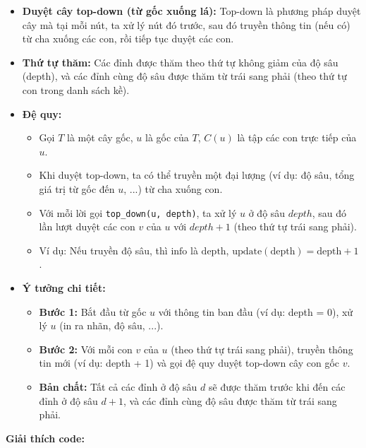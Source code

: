 \documentclass{article}
\begin{document}
\begin{itemize}
    \item \textbf{Duyệt cây top-down (từ gốc xuống lá):} Top-down là phương pháp duyệt cây mà tại mỗi nút, ta xử lý nút đó trước, sau đó truyền thông tin (nếu có) từ cha xuống các con, rồi tiếp tục duyệt các con. 
    \item \textbf{Thứ tự thăm:} Các đỉnh được thăm theo thứ tự không giảm của độ sâu (depth), và các đỉnh cùng độ sâu được thăm từ trái sang phải (theo thứ tự con trong danh sách kề).
    \item \textbf{Đệ quy:}
    \begin{itemize}
        \item Gọi $T$ là một cây gốc, $u$ là gốc của $T$, $C(u)$ là tập các con trực tiếp của $u$.
        \item Khi duyệt top-down, ta có thể truyền một đại lượng (ví dụ: độ sâu, tổng giá trị từ gốc đến $u$, ...) từ cha xuống con.
        \item Với mỗi lời gọi \texttt{top\_down(u, depth)}, ta xử lý $u$ ở độ sâu $depth$, sau đó lần lượt duyệt các con $v$ của $u$ với $depth+1$ (theo thứ tự trái sang phải).
        \item Ví dụ: Nếu truyền độ sâu, thì $\text{info}$ là $\text{depth}$, $\text{update}(\text{depth}) = \text{depth} + 1$.
    \end{itemize}
    \item \textbf{Ý tưởng chi tiết:}
    \begin{itemize}
        \item \textbf{Bước 1:} Bắt đầu từ gốc $u$ với thông tin ban đầu (ví dụ: depth = 0), xử lý $u$ (in ra nhãn, độ sâu, ...).
        \item \textbf{Bước 2:} Với mỗi con $v$ của $u$ (theo thứ tự trái sang phải), truyền thông tin mới (ví dụ: depth + 1) và gọi đệ quy duyệt top-down cây con gốc $v$.
        \item \textbf{Bản chất:} Tất cả các đỉnh ở độ sâu $d$ sẽ được thăm trước khi đến các đỉnh ở độ sâu $d+1$, và các đỉnh cùng độ sâu được thăm từ trái sang phải.
    \end{itemize}
\end{itemize}

\textbf{Giải thích code:}
\end{document}
